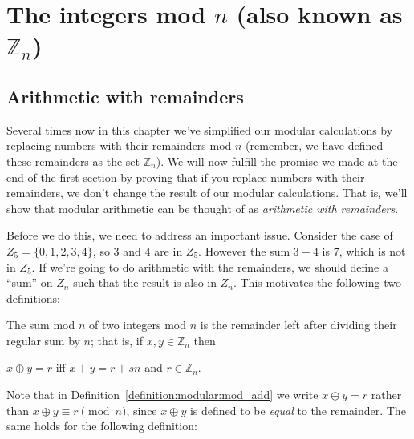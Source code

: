 \section{The integers mod $n$ (also known as ${\mathbb Z}_n$)}

\subsection{Arithmetic with remainders}\label{ArithWithRems}
Several times now in this chapter we've simplified our modular calculations by replacing numbers with their remainders mod $n$ (remember, we have defined these remainders as the set ${\mathbb Z}_n$).  We will now fulfill the promise we made at the end of the first section by proving that if you replace numbers with their remainders, we don't change the result of our modular calculations.  That is, we'll show that modular arithmetic can be thought of as \emph{arithmetic with remainders}.

Before we do this, we need to address an important issue. Consider the case of $Z_5 = \{0,1,2,3,4\}$, so 3 and 4 are in $Z_5$. However the sum $3 + 4$ is 7, which is not in $Z_5$. If we're going to do arithmetic with the remainders, we should define a ``sum'' on $Z_n$ such that the result is also in $Z_n$. This motivates the following two definitions:




\begin{defn}\label{definition:modular:mod_add}

\noindent
The sum mod $n$ of two integers mod $n$ is the remainder left after dividing their regular sum by $n$; that is, if $x,y \in {\mathbb Z}_n$ then

\begin{center}
$x \oplus y = r$ iff  $x + y = r + sn$ and 
$r \in {\mathbb Z}_n.$
\end{center}
\end{defn}
Note that in Definition~\ref{definition:modular:mod_add} we write $x \oplus y = r$ rather than $x \oplus y \equiv r \pmod{n}$, since $x \oplus y$ is defined to be \emph{equal} to the remainder. The same holds for the following definition:

